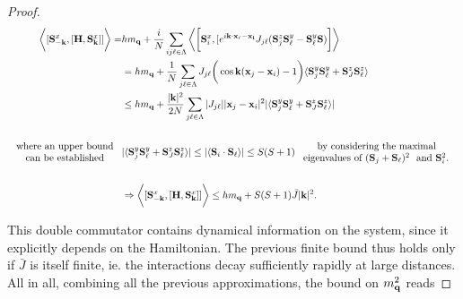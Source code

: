 \documentclass{homework}
\begin{document}
\begin{proof}
\begin{equation}
    \begin{split}
        \bigg \langle [{\bf S}^x_{-{\bf k}}, [{\bf H}, {\bf S}^x_{{\bf k}}]] \bigg \rangle =& h m_{\bf q} + \frac{i}{N} \sum_{ij\ell \in \Lambda}\bigg \langle \bigg[{\bf S}^x_{i}, [e^{i {\bf k} \cdot {\bf x_\ell - x_i}}J_{j\ell} ({\bf S}_j^z {\bf S}_\ell^y - {\bf S}_\ell^y {\bf S})\bigg] \bigg  \rangle \\
        &= h m_{\bf q} + \frac{1}{N} \sum_{j \ell \in \Lambda} J_{j \ell} \bigg( \cos {\bf k} ({\bf x}_j - {\bf x}_i) - 1\bigg) \langle {\bf S}_j^y {\bf S}_\ell^y + {\bf S}_{J}^z {\bf S}_\ell^z \rangle \\
        & \leq h m_{\bf q} + \frac{|{\bf k}|^2}{2N} \sum_{j \ell \in \Lambda} |J_{j\ell}| |{\bf x}_j - {\bf x}_i|^2 |\langle {\bf S}_j^y {\bf S}_\ell^y + {\bf S}_{J}^z {\bf S}_\ell^z \rangle| \\
        \\
        \begin{array}{c}
             \textnormal{ where an upper bound }  \\
             \textnormal{ can be established } 
        \end{array}
        &|\langle {\bf S}_j^y {\bf S}_\ell^y + {\bf S}_{J}^z {\bf S}_\ell^z \rangle| \leq |\langle {\bf S}_{i} \cdot {\bf S}_{\ell}\rangle| \leq S(S+1) \begin{array}{c}
             \textnormal{ by considering the maximal  }  \\
             \textnormal{ eigenvalues of $({\bf S}_j + {\bf S}_{\ell})^2$ }
             \textnormal{ and ${\bf S}_i^2$. }
        \end{array} \\
        \\
        &\Rightarrow  \bigg \langle [{\bf S}^x_{-{\bf k}}, [{\bf H}, {\bf S}^x_{{\bf k}}]] \bigg \rangle \leq h m_{{\bf q}} + S(S+1) \bar{J} |{\bf k}|^2. \label{Bogoliubov inequality double comm}
    \end{split}
\end{equation}

This double commutator contains dynamical information on the system, since it explicitly depends on the Hamiltonian. The previous finite bound thus holds only if $\bar{J}$ is itself finite, ie. the interactions decay sufficiently rapidly at large distances. All in all, combining all the previous approximations, the bound on $m_{\bf q}^2$ reads 


\end{proof}
\end{document}
